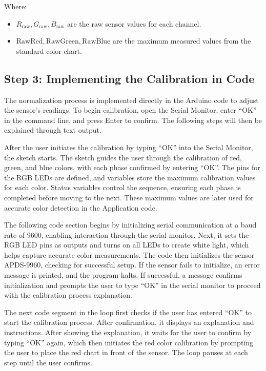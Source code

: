 Where:

\begin{itemize}
	\item $R_{\text{raw}}, G_{\text{raw}}, B_{\text{raw}}$ are the raw sensor values for each channel.
	\item $\text{RawRed}, \text{RawGreen}, \text{RawBlue}$ are the maximum measured values from the standard color chart.
\end{itemize}

\subsection{Step 3: Implementing the Calibration in Code}

The normalization process is implemented directly in the Arduino code to adjust the sensor's readings. To begin calibration, open the Serial Monitor, enter ``OK'' in the command line, and press Enter to confirm. The following steps will then be explained through text output.

\bigskip

After the user initiates the calibration by typing ``OK'' into the Serial Monitor, the sketch starts. The sketch guides the user through the calibration of red, green, and blue colors, with each phase confirmed by entering ``OK''. The pins for the RGB LEDs are defined, and variables store the maximum calibration values for each color. Status variables control the sequence, ensuring each phase is completed before moving to the next. These maximum values are later used for accurate color detection in the Application code.

\bigskip


The following code section begins by initializing serial communication at a baud rate of 9600, enabling interaction through the serial monitor. Next, it sets the RGB LED pins as outputs and turns on all LEDs to create white light, which helps capture accurate color measurements. The code then initializes the sensor APDS-9960, checking for successful setup. If the sensor fails to initialize, an error message is printed, and the program halts. If successful, a message confirms initialization and prompts the user to type ``OK'' in the serial monitor to proceed with the calibration process explanation.

\bigskip

The next code segment in the loop first checks if the user has entered ``OK'' to start the calibration process. After confirmation, it displays an explanation and instructions. After showing the explanation, it waits for the user to confirm by typing ``OK'' again, which then initiates the red color calibration by prompting the user to place the red chart in front of the sensor. The loop pauses at each step until the user confirms.

